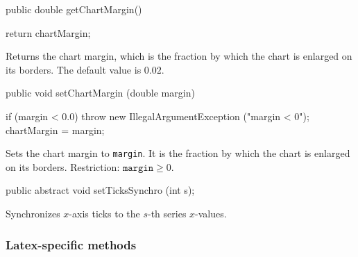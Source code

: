 \begin{htmlonly}
\end{htmlonly}
\begin{code}

   public double getChartMargin() \begin{hide} {
      return chartMargin;
   }\end{hide}
\end{code}
\begin{tabb}
    Returns the chart margin, which is the fraction by which the chart
    is enlarged on its borders. The default value is $0.02$.
\end{tabb}
\begin{code}

   public void setChartMargin (double margin) \begin{hide} {
      if (margin < 0.0)
         throw new IllegalArgumentException ("margin < 0");
      chartMargin = margin;
   }\end{hide}
\end{code}
\begin{tabb}
    Sets the chart margin to \texttt{margin}. It is the fraction by
    which the chart is enlarged on its borders.
   Restriction: $\texttt{margin} \ge 0$.
\end{tabb}
\begin{htmlonly}
\end{htmlonly}
\begin{code}

   public abstract void setTicksSynchro (int s);
\end{code}
\begin{tabb}
   Synchronizes $x$-axis ticks to the $s$-th series $x$-values.
\end{tabb}
\begin{htmlonly}
\end{htmlonly}



\subsubsection*{Latex-specific methods}

